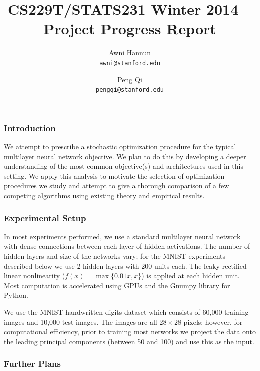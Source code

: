 \documentclass[12pt,english]{article}
\title{
{\large CS229T/STATS231 Winter 2014 -- Project Progress Report }
}
\author{ \large
Awni Hannun \\
\texttt{awni@stanford.edu}
\and
Peng Qi \\
\texttt{pengqi@stanford.edu}
}
\date{}
\newcommand{\1}{\mathbb{I}} %
\begin{document}
\maketitle

\subsubsection*{Introduction}
We attempt to prescribe a stochastic optimization procedure for the typical
multilayer neural network objective. We plan to do this by developing a deeper
understanding of the most common objective(s) and architectures used in this
setting. We apply this analysis to motivate the selection of optimization
procedures we study and attempt to give a thorough comparison of a few
competing algorithms using existing theory and empirical results. 

\subsubsection*{Experimental Setup}

In most experiments performed, we use a standard multilayer neural network with
dense connections between each layer of hidden activations. The number of
hidden layers and size of the networks vary; for the MNIST experiments
described below we use 2 hidden layers with 200 units each. The leaky rectified
linear nonlinearity ($f(x) = \max\{0.01x,x\}$) is applied at each hidden unit.
Most computation is accelerated using GPUs and the Gnumpy library for Python. 

We use the MNIST handwritten digits dataset which consists of 60,000 training
images and 10,000 test images. The images are all $28\times28$ pixels; however,
for computational efficiency, prior to training most networks we project the
data onto the leading principal components (between 50 and 100) and use this as
the input.




\subsubsection*{Further Plans}
\end{document}
